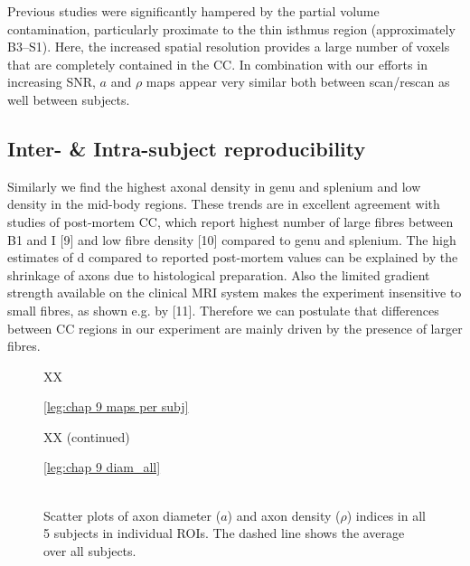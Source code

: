 Previous studies were significantly hampered by the partial volume contamination, particularly proximate to the thin isthmus region (approximately B3--S1). Here, the increased spatial resolution provides a large number of voxels that are completely contained in the CC. In combination with our efforts in increasing SNR, $a$ and $\rho$ maps appear very similar both between scan/rescan as well between subjects.  

\subsection*{Inter- \& Intra-subject reproducibility}
  Similarly we find the highest axonal density in genu and splenium and low density in the mid-body regions. These trends are in excellent agreement with studies of post-mortem CC, which report highest number of large fibres between B1 and I [9] and low fibre density [10] compared to genu and splenium. The high estimates of d compared to reported post-mortem values can be explained by the shrinkage of axons due to histological preparation. Also the limited gradient strength available on the clinical MRI system makes the experiment insensitive to small fibres, as shown e.g. by [11]. Therefore we can postulate that differences between CC regions in our experiment are mainly driven by the presence of larger fibres.
\begin{figure}[ht\textbf{]}
	\centering
	\subfloat[]
	{
	}
	\caption{XX}
	\label{fig:chap9 scan rescan maps per subject}	
\end{figure}	
\begin{figure}[ht]
	\centering
   \ContinuedFloat 
	\ref{leg:chap 9 maps per subj}
	\caption{XX (continued)}
	\label{fig:chap9 scan rescan maps per subject}
\end{figure}

\begin{figure}[ht]
	\centering
	\ref{leg:chap 9 diam_all}
	\\	
	\\
	\caption{Scatter plots of axon diameter ($a$) and axon density ($\rho$) indices in all 5 subjects in individual ROIs. The dashed line shows the average over all subjects.}
	\label{fig:chap9 scan rescan scatterplots per subject}
\end{figure}

